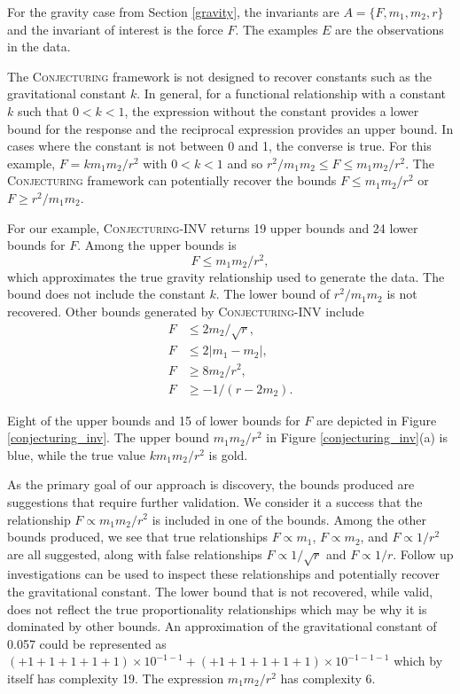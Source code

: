 \documentclass[ijds,nonblindrev]{informs-ijds}
\begin{document}
For the gravity case from Section \ref{gravity}, the invariants are $A = \{F, m_1, m_2, r\}$ and the invariant of interest is the force $F$.  The examples $E$ are the observations in the data.


The \textsc{Conjecturing} framework is not designed to recover constants such as the gravitational constant $k$.  In general, for a functional relationship with a constant $k$ such that $0 < k < 1$, the expression without the constant provides a lower bound for the response and the reciprocal expression provides an upper bound.  In cases where the constant is not between 0 and 1, the converse is true.  For this example, $F= k m_1 m_2/r^2$ with $0 < k < 1$ and so $r^2/m_1m_2 \leq F \leq m_1m_2/r^2  $.  The \textsc{Conjecturing} framework can potentially recover the bounds $F \leq m_1m_2/r^2$ or $F \geq r^2/m_1m_2$.

For our example, \textsc{Conjecturing-INV} returns 19 upper bounds and 24 lower bounds for $F$.  Among the upper bounds is 
\[
F \leq  m_1m_2/r^2,
\]
which approximates the true gravity relationship used to generate the data.  The bound does not include the constant $k$.  
The lower bound of $r^2/m_1m_2$ is not recovered.
Other bounds generated by \textsc{Conjecturing-INV} include
\begin{align}
F & \leq 2m_2/\sqrt{r},\\
F & \leq 2|m_1-m_2|, \\
F & \geq 8m_2/r^2, \\
F & \geq -1/(r-2m_2).
\end{align}

Eight of the upper bounds and 15 of lower bounds for $F$ are depicted in Figure \ref{conjecturing_inv}.  The upper bound $m_1m_2/r^2$ in Figure \ref{conjecturing_inv}(a) is blue, while the true value $km_1m_2/r^2$ is gold.

As the primary goal of our approach is discovery, the bounds produced are suggestions that require further validation.  We consider it a success that the relationship $F \propto m_1m_2/r^2$ is included in one of the bounds.  Among the other bounds produced, we see that true relationships $F \propto m_1$, $F \propto m_2$, and $F \propto 1/r^2$ are all suggested, along with false relationships $F \propto 1/\sqrt{r}$ and $F \propto 1/r$.  Follow up investigations can be used to inspect these relationships and potentially recover the gravitational constant.  The lower bound that is not recovered, while valid, does not reflect the true proportionality relationships which may be why it is dominated by other bounds. An approximation of the gravitational constant of 0.057 could be represented as $(+1+1+1+1+1)\times 10^{-1-1} + (+1+1+1+1+1)\times 10^{-1-1-1}$ which by itself has complexity 19.  The expression $m_1m_2/r^2$ has complexity 6.
\end{document}
